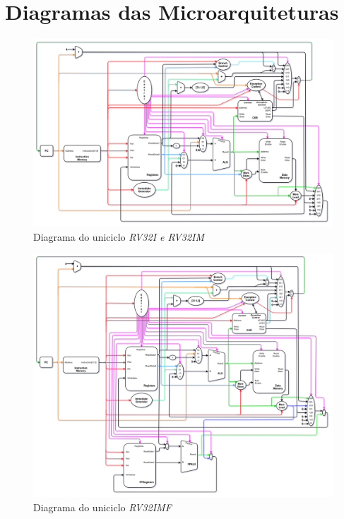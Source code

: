 \chapter{Diagramas das Microarquiteturas}\label{anexo_diagramas}

\begin{figure}[H]
\centering
    \includegraphics[angle=90,width=1\textwidth,height=.85\textheight,keepaspectratio]{../images/uarch_diagrams/singlecycle-RV32I-RV32IM.png}
    \caption{Diagrama do uniciclo \textit{RV32I e RV32IM}}
\end{figure}

\begin{figure}[H]
\centering
    \includegraphics[angle=90,width=1\textwidth,height=1\textheight,keepaspectratio]{../images/uarch_diagrams/singlecycle-RV32IMF.png}
    \caption{Diagrama do uniciclo \textit{RV32IMF}}
\end{figure}

